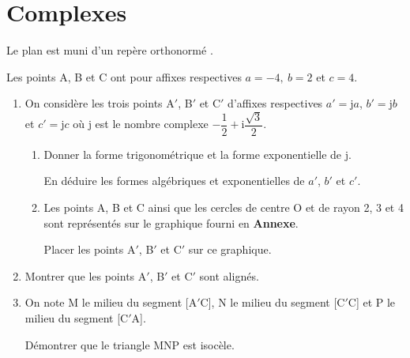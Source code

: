 \documentclass{cornouaille}
\begin{document}
\section{Complexes}
\begin{exercice}


Le plan est muni d'un repère orthonormé \Ouv.

\smallskip

Les points A, B et C ont pour affixes respectives $a = - 4,\: b = 2$ et $c = 4$.

\medskip

\begin{enumerate}
\item On considère les trois points A$'$, B$'$ et C$'$ d'affixes respectives $a'= \text{j}a$, $b'= \text{j}b$ et $c'= \text{j}c$ où j est le nombre complexe $-\dfrac{1}{2} + \text{i}\dfrac{\sqrt{3}}{2}$.

	\begin{enumerate}
		\item Donner la forme trigonométrique et la forme exponentielle de j.
		
En déduire les formes algébriques et exponentielles de $a'$, $b'$ et $c'$.
		\item Les points A, B et C ainsi que les cercles de centre O et de rayon 2, 3 et 4 sont
représentés sur le graphique fourni en \textbf{Annexe}.
		
Placer les points A$'$, B$'$ et C$'$ sur ce graphique.
	\end{enumerate}
\item  Montrer que les points A$'$, B$'$ et C$'$ sont alignés.
\item  On note M le milieu du segment [A$'$C], N le milieu du segment [C$'$C] et P le milieu du
segment [C$'$A]. 
	
Démontrer que le triangle MNP est isocèle.
\end{enumerate}
\end{exercice}
\end{document}
